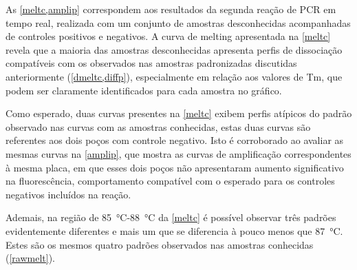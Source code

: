 As \cref{meltc,amplip} correspondem aos resultados da segunda reação de PCR em
tempo real, realizada com um conjunto de amostras desconhecidas acompanhadas de
controles positivos e negativos. A curva de melting apresentada na \cref{meltc}
revela que a maioria das amostras desconhecidas apresenta perfis de dissociação
compatíveis com os observados nas amostras padronizadas discutidas anteriormente
(\cref{dmeltc,diffp}), especialmente em relação aos valores de Tm, que podem ser
claramente identificados para cada amostra no gráfico.

Como esperado, duas curvas presentes na \cref{meltc} exibem perfis atípicos do
padrão observado nas curvas com as amostras conhecidas, estas duas curvas são
referentes aos dois poços com controle negativo. Isto é corroborado ao avaliar
as mesmas curvas na \cref{amplip}, que mostra as curvas de amplificação
correspondentes à mesma placa, em que esses dois poços não apresentaram aumento
significativo na fluorescência, comportamento compatível com o esperado para os
controles negativos incluídos na reação.

Ademais, na região de \qty{85}{\celsius}-\qty{88}{\celsius} da \cref{meltc} é
possível observar três padrões evidentemente diferentes e mais um que se
diferencia à pouco menos que \qty{87}{\celsius}. Estes são os mesmos quatro
padrões observados nas amostras conhecidas (\cref{rawmelt}).
